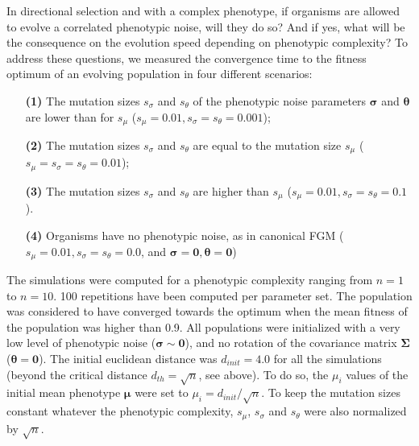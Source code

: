 In directional selection and with a complex phenotype, if organisms are allowed to evolve a correlated phenotypic noise, will they do so? And if yes, what will be the consequence on the evolution speed depending on phenotypic complexity? To address these questions, we measured the convergence time to the fitness optimum of an evolving population in four different scenarios:
\begin{enumerate}
\item[\textbf{(1)}] The mutation sizes $s_\sigma$ and $s_\theta$ of the phenotypic noise parameters $\boldsymbol{\sigma}$ and $\boldsymbol{\theta}$ are lower than for $s_\mu$ ($s_\mu = 0.01, s_\sigma = s_\theta = 0.001$);
\item[\textbf{(2)}] The mutation sizes $s_\sigma$ and $s_\theta$ are equal to the mutation size $s_\mu$ ($s_\mu = s_\sigma = s_\theta = 0.01$);
\item[\textbf{(3)}] The mutation sizes $s_\sigma$ and $s_\theta$ are higher than $s_\mu$ ($s_\mu = 0.01, s_\sigma = s_\theta = 0.1$).
\item[\textbf{(4)}] Organisms have no phenotypic noise, as in canonical FGM ($s_\mu = 0.01, s_\sigma = s_\theta = 0.0$, and $\boldsymbol{\sigma}=\boldsymbol{0}, \boldsymbol{\theta}=\boldsymbol{0}$)
\end{enumerate}

The simulations were computed for a phenotypic complexity ranging from $n=1$ to $n=10$. 100 repetitions have been computed per parameter set. The population was considered to have converged towards the optimum when the mean fitness of the population was higher than 0.9.
All populations were initialized with a very low level of phenotypic noise ($\boldsymbol{\sigma} \sim \boldsymbol{0}$), and no rotation of the covariance matrix $\boldsymbol{\Sigma}$ ($\boldsymbol{\theta} = \boldsymbol{0}$). The initial euclidean distance was $d_{init} = 4.0$ for all the simulations (beyond the critical distance $d_{th} = \sqrt{n}$, see above). To do so, the $\mu_i$ values of the initial mean phenotype $\boldsymbol{\mu}$ were set to $\mu_i = d_{init}/\sqrt{n}$.
To keep the mutation sizes constant whatever the phenotypic complexity, $s_\mu$, $s_\sigma$ and $s_\theta$ were also normalized by $\sqrt{n}$.

